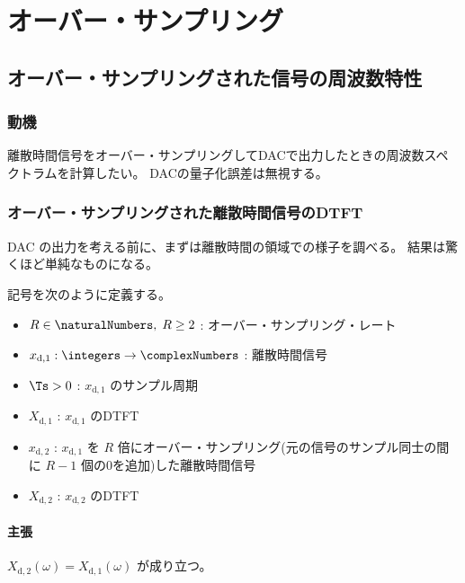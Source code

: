 \chapter{オーバー・サンプリング}
    \section{オーバー・サンプリングされた信号の周波数特性}
        \newcommand{\xda}{x_{\text{d},1}}
        \newcommand{\Xda}{X_{\text{d},1}}
        \newcommand{\xdb}{x_{\text{d},2}}
        \newcommand{\Xdb}{X_{\text{d},2}}
        \subsection{動機}
            離散時間信号をオーバー・サンプリングしてDACで出力したときの周波数スペクトラムを計算したい。
            DACの量子化誤差は無視する。
        \subsection{オーバー・サンプリングされた離散時間信号のDTFT}
            DAC の出力を考える前に、まずは離散時間の領域での様子を調べる。
            結果は驚くほど単純なものになる。
            \par
            記号を次のように定義する。
            \begin{itemize}
                \item $R\in\naturalNumbers,\;R\geq 2$ : オーバー・サンプリング・レート
                \item $\xda:\integers\to\complexNumbers$ : 離散時間信号
                \item $\Ts>0$ : $\xda$ のサンプル周期
                \item $\Xda$ : $\xda$ のDTFT
                \item $\xdb$ : $\xda$ を $R$ 倍にオーバー・サンプリング(元の信号のサンプル同士の間に $R-1$ 個の0を追加)した離散時間信号
                \item $\Xdb$ : $\xdb$ のDTFT
            \end{itemize}
            \subsubsection{主張}
                $\Xdb(\omega) = \Xda(\omega)$ が成り立つ。
